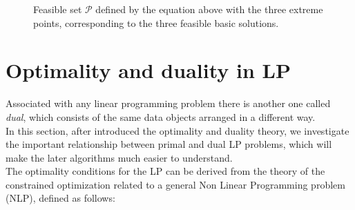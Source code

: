 \documentclass[a4paper,10 pt,titlepage,twoside]{book}
\theoremstyle{plain}
\theoremstyle{definition}
\newtheorem{ex}[thm]{Example}
\theoremstyle{remark}
\begin{document}
\begin{figure}[h]\caption{\label{tetra}Feasible set $\mathcal{P}$ defined by the equation above with the three extreme points, corresponding to the three feasible basic solutions.} 
\begin{center}
\end{center}
\end{figure}

\section{Optimality and duality in LP}
Associated with any linear programming problem there is another one called \textit{dual}, which consists of the same data objects arranged in a different way.\\In this section, after introduced the optimality and duality theory, we investigate the important relationship between primal and dual LP problems, which will make the later algorithms
much easier to understand.\\ 
The optimality conditions for the LP can be derived from the theory of the constrained optimization related to a general Non Linear Programming problem (NLP), defined as follows:
\end{document}
